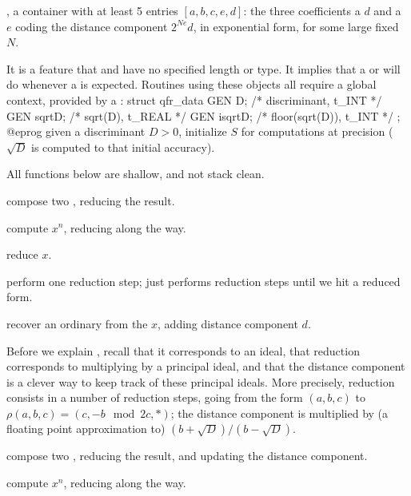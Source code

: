 \item {}, a container with at least 5 entries $[a,b,c,e,d]$: the
three coefficients a  $d$ and a  $e$ coding the distance
component $2^{Ne} d$, in exponential form, for some large fixed $N$.

It is a feature that  and  have no specified length or
type. It implies that a  or  will do whenever a 
is expected. Routines using these objects all require a global context,
provided by a :
\bprog
  struct qfr_data {
    GEN D;        /* discriminant, t_INT   */
    GEN sqrtD;    /* sqrt(D), t_REAL       */
    GEN isqrtD;   /* floor(sqrt(D)), t_INT */
  };
@eprog
given a discriminant $D > 0$, initialize $S$ for computations at precision
 ($\sqrt{D}$ is computed to that initial accuracy).

\noindent All functions below are shallow, and not stack clean.

 compose two
, reducing the result.

 compute $x^n$, reducing
along the way.

 reduce $x$.

 perform one reduction step;
 just performs reduction steps until we hit a reduced form.

 recover an ordinary  from the
 $x$, adding distance component $d$.

Before we explain , recall that it corresponds to an ideal, that
reduction corresponds to multiplying by a principal ideal, and that the
distance component is a clever way to keep track of these principal ideals.
More precisely, reduction consists in a number of reduction steps,
going from the form $(a,b,c)$ to $\rho(a,b,c) = (c, -b \mod 2c, *)$;
the distance component is multiplied by (a floating point approximation to)
$(b + \sqrt{D}) / (b - \sqrt{D})$.

 compose two
, reducing the result, and updating the distance component.

 compute $x^n$, reducing
along the way.

